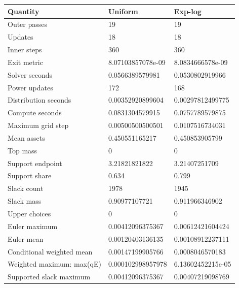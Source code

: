 \begin{tabular}{lll}
\hline
Quantity & Uniform & Exp-log \\
\hline
Outer passes & 19 & 19 \\
Updates & 18 & 18 \\
Inner steps & 360 & 360 \\
Exit metric & 8.07103857078e-09 & 8.0834666578e-09 \\
Solver seconds & 0.0566389579981 & 0.0530802919966 \\
Power updates & 172 & 168 \\
Distribution seconds & 0.00352920899604 & 0.00297812499775 \\
Compute seconds & 0.0831304579915 & 0.0757789579875 \\
Maximum grid step & 0.00500500500501 & 0.0107516734031 \\
Mean assets & 0.450551165217 & 0.450853905799 \\
Top mass & 0 & 0 \\
Support endpoint & 3.21821821822 & 3.21407251709 \\
Support share & 0.634 & 0.799 \\
Slack count & 1978 & 1945 \\
Slack mass & 0.90977107721 & 0.911966346902 \\
Upper choices & 0 & 0 \\
Euler maximum & 0.00412096375367 & 0.00612421604424 \\
Euler mean & 0.00120403136135 & 0.00108912237111 \\
Conditional weighted mean & 0.00147199905766 & 0.0008046570183 \\
Weighted maximum: max(qE) & 0.000102998957978 & 6.13602452215e-05 \\
Supported slack maximum & 0.00412096375367 & 0.00407219098769 \\
\hline
\end{tabular}
